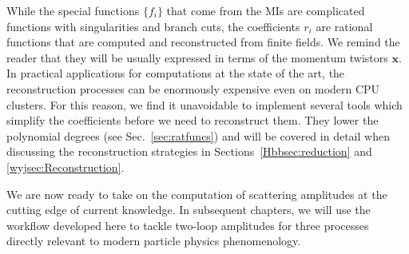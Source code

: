 \documentclass[main.tex]{subfiles}
\begin{document}
While the special functions $\{f_i\}$ that come from the MIs are complicated functions with singularities and branch cuts, the coefficients $r_i$ are rational functions that are computed and reconstructed from finite fields. We remind the reader that they will be usually expressed in terms of the momentum twistors $\mathbf{x}$. In practical applications for computations at the state of the art, the reconstruction processes can be enormously expensive even on modern CPU clusters. For this reason, we find it unavoidable to implement several tools which simplify the coefficients before we need to reconstruct them. They lower the polynomial degrees (see Sec.~\ref{sec:ratfuncs}) and will be covered in detail when discussing the reconstruction strategies in Sections~\ref{Hbbsec:reduction} and \ref{wyjsec:Reconstruction}.

We are now ready to take on the computation of scattering amplitudes at the cutting edge of current knowledge. In subsequent chapters, we will use the workflow developed here to tackle two-loop amplitudes for three processes directly relevant to modern particle physics phenomenology.
\end{document}
